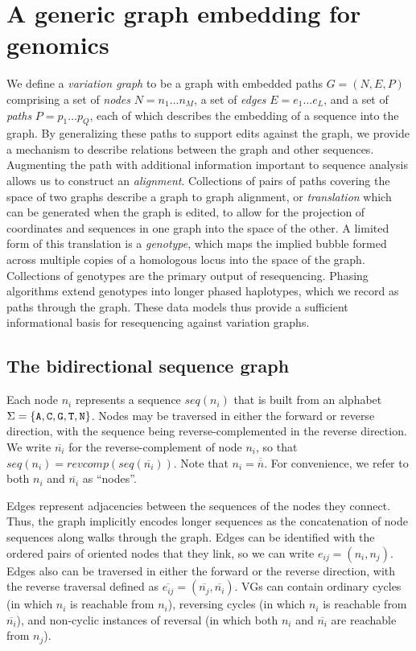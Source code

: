 \section{A generic graph embedding for genomics}

We define a \emph{variation graph} to be a graph with embedded paths $G = (N, E, P)$ comprising a set of \emph{nodes} $N = n_1 \ldots n_M$, a set of \emph{edges} $E = e_1 \ldots e_L$, and a set of \emph{paths} $P = p_1 \ldots p_Q$, each of which describes the embedding of a sequence into the graph.
By generalizing these paths to support edits against the graph, we provide a mechanism to describe relations between the graph and other sequences.
Augmenting the path with additional information important to sequence analysis allows us to construct an \emph{alignment}.
Collections of pairs of paths covering the space of two graphs describe a graph to graph alignment, or \emph{translation} which can be generated when the graph is edited, to allow for the projection of coordinates and sequences in one graph into the space of the other.
A limited form of this translation is a \emph{genotype}, which maps the implied bubble formed across multiple copies of a homologous locus into the space of the graph.
Collections of genotypes are the primary output of resequencing.
Phasing algorithms extend genotypes into longer phased haplotypes, which we record as paths through the graph.
These data models thus provide a sufficient informational basis for resequencing against variation graphs.

\subsection{The bidirectional sequence graph}

Each node $n_i$ represents a sequence $seq(n_i)$ that is built from an alphabet $\Sigma = \{ {\tt A, C, G, T, N} \}$. Nodes may be traversed in either the forward or reverse direction, with the sequence being reverse-complemented in the reverse direction.
We write $\overline{n_i}$ for the reverse-complement of node $n_i$, so that $seq(n_i) = revcomp(seq(\overline{n_i}))$.
Note that $n_i = \overline{\overline{n}}$. For convenience, we refer to both $n_i$ and $\overline{n_i}$ as ``nodes''.

Edges represent adjacencies between the sequences of the nodes they connect.
Thus, the graph implicitly encodes longer sequences as the concatenation of node sequences along walks through the graph.
Edges can be identified with the ordered pairs of oriented nodes that they link, so we can write $e_{ij} = (n_i,n_j)$.
Edges also can be traversed in either the forward or the reverse direction, with the reverse traversal defined as $\overline{e_{ij}} = (\overline{n_j},\overline{n_i})$.
VGs can contain ordinary cycles (in which $n_i$ is reachable from $n_i$), reversing cycles (in which $n_i$ is reachable from $\overline{n_i}$), and non-cyclic instances of reversal (in which both $n_i$ and $\overline{n_i}$ are reachable from $n_j$).

